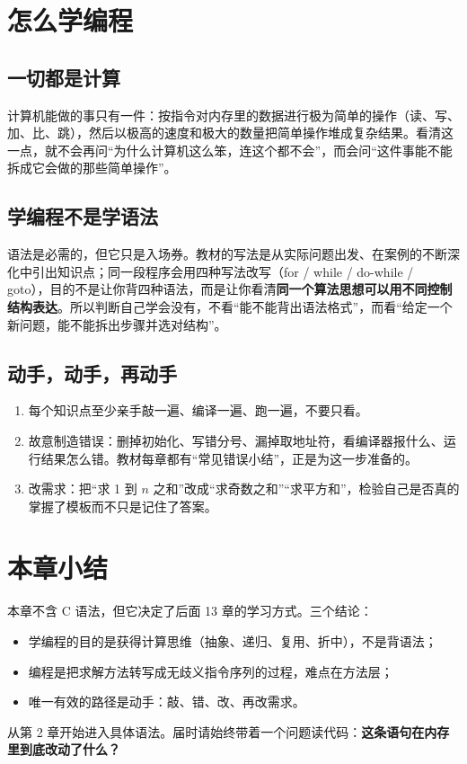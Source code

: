 
\section{怎么学编程}

\subsection{一切都是计算}

计算机能做的事只有一件：按指令对内存里的数据进行极为简单的操作（读、写、加、比、跳），然后以极高的速度和极大的数量把简单操作堆成复杂结果。看清这一点，就不会再问“为什么计算机这么笨，连这个都不会”，而会问“这件事能不能拆成它会做的那些简单操作”。

\subsection{学编程不是学语法}

语法是必需的，但它只是入场券。教材的写法是从实际问题出发、在案例的不断深化中引出知识点；同一段程序会用四种写法改写（for / while / do-while / goto），目的不是让你背四种语法，而是让你看清\textbf{同一个算法思想可以用不同控制结构表达}。所以判断自己学会没有，不看“能不能背出语法格式”，而看“给定一个新问题，能不能拆出步骤并选对结构”。

\subsection{动手，动手，再动手}

\begin{enumerate}
  \item 每个知识点至少亲手敲一遍、编译一遍、跑一遍，不要只看。
  \item 故意制造错误：删掉初始化、写错分号、漏掉取地址符，看编译器报什么、运行结果怎么错。教材每章都有“常见错误小结”，正是为这一步准备的。
  \item 改需求：把“求 1 到 $n$ 之和”改成“求奇数之和”“求平方和”，检验自己是否真的掌握了模板而不只是记住了答案。
\end{enumerate}

\section{本章小结}

本章不含 C 语法，但它决定了后面 13 章的学习方式。三个结论：

\begin{itemize}
  \item 学编程的目的是获得计算思维（抽象、递归、复用、折中），不是背语法；
  \item 编程是把求解方法转写成无歧义指令序列的过程，难点在方法层；
  \item 唯一有效的路径是动手：敲、错、改、再改需求。
\end{itemize}

从第 2 章开始进入具体语法。届时请始终带着一个问题读代码：\textbf{这条语句在内存里到底改动了什么？}
